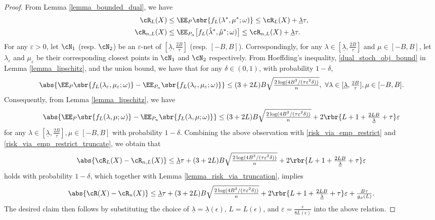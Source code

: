 \documentclass[9pt]{article} %
\numberwithin{equation}{section}
\renewcommand{\frac}[2]{\tfrac{#1}{#2}}
\begin{document}
\begin{proof}
From Lemma \ref{lemma_bounded_dual}, 
we have 
\begin{align}
\cR_L(X)   & \leq   \EE_P \sbr{f_L (\lambda^*, \mu^*; \omega)} \leq   \cR_L(X) + \underline{\lambda} \tau , \label{risk_via_emp_restrict} \\
   \cR_{n,L}(X)  & \leq  \EE_{P_n} \big[{f_L (\hat{\lambda}^*, \hat{\mu}^*; \omega)} \big] \leq \cR_{n,L}(X) +  \underline{\lambda}  \tau . \label{risk_via_emp_restrict_truncate}
\end{align}
For any $\varepsilon > 0$, let $\cN_1$ (resp. $\cN_2$) be an $\varepsilon$-net of $[\underline{\lambda}, \frac{2B}{\tau}]$ (resp. $[-B, B]$). 
Correspondingly, for any $\lambda \in  [\underline{\lambda}, \frac{2B}{\tau}]$ and $\mu \in [-B, B]$, let 
$\lambda_\varepsilon$ and $\mu_\varepsilon$ be their corresponding closest points in $\cN_1$ and $\cN_2$ respectively. 
From Hoeffding's inequality, \eqref{dual_stoch_obj_bound} in Lemma \ref{lemma_lipschitz}, and the union bound, we have that for any $\delta \in (0,1)$, with probability $1-\delta$,
\begin{align*}
\abs{
\EE_{P} \sbr{f_L (\lambda_\varepsilon, \mu_\varepsilon; \omega)}  - \EE_{P_n} \sbr{f_L (\lambda_\varepsilon, \mu_\varepsilon; \omega)}
}
\leq 
(3+2L)B \sqrt{\frac{2 \log(4 B^2/(\tau \varepsilon^2 \delta))}{n}}, 
~ \forall \lambda \in [\underline{\lambda}, \frac{2B}{\tau}], \mu \in [-B, B].
\end{align*}
Consequently, from Lemma \ref{lemma_lipschitz},  we have
\begin{align*}
\abs{
\EE_{P} \sbr{f_L (\lambda, \mu; \omega)}  - \EE_{P_n} \sbr{f_L (\lambda, \mu; \omega)}
}
\leq 
(3+2L)B \sqrt{\frac{2 \log(4B^2/(\tau \varepsilon^2 \delta))}{n}} 
+ 2  \rbr{L+1 +  \frac{2LB}{\underline{\lambda}} + \tau} \varepsilon
\end{align*}  
for any $\lambda \in [\underline{\lambda}, \frac{2B}{\tau}], \mu \in [-B, B]$ 
with probability $1-\delta$.
Combining the above observation with \eqref{risk_via_emp_restrict} and \eqref{risk_via_emp_restrict_truncate}, we obtain that 
\begin{align}\label{ineq_contration_risk_truncated_raw}
\abs{\cR_L(X) - \cR_{n,L}(X)} \leq 
\underline{\lambda} \tau + 
(3+2L)B \sqrt{\frac{2 \log(4B^2/(\tau \varepsilon^2 \delta))}{n}} 
+ 2  \rbr{L+1 +  \frac{2LB}{\underline{\lambda}} + \tau} \varepsilon
\end{align}
holds with probability $1-\delta$,
which together with Lemma \ref{lemma_risk_via_truncation}, implies 
\begin{align*}
\abs{\cR(X) - \cR_{n}(X)} \leq 
\underline{\lambda} \tau + 
(3+2L)B \sqrt{\frac{2 \log(4B^2/(\tau \varepsilon^2 \delta))}{n}} 
+ 2  \rbr{L+1 +  \frac{2LB}{\underline{\lambda}} + \tau} \varepsilon
+ \frac{B \tau}{g_\phi(L)}.
\end{align*}
The desired claim then follows by substituting the choice of 
$\underline{\lambda} = \underline{\lambda}(\epsilon)$,
$L = L(\epsilon)$, and $\varepsilon = \frac{\epsilon}{8 \overline{L}(\epsilon)}$ into the above relation.
\end{proof}
\end{document}
